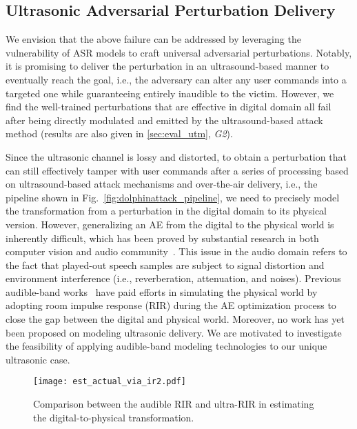

\subsection{Ultrasonic Adversarial Perturbation Delivery}\label{sec:preliminary_uap_delivery}
We envision that the above failure can be addressed by leveraging the vulnerability of ASR models to craft universal adversarial perturbations. Notably, it is promising to deliver the perturbation in an ultrasound-based manner to eventually reach the goal, i.e., the adversary can alter any user commands into a targeted one while guaranteeing entirely inaudible to the victim. However, we find the well-trained perturbations that are effective in digital domain all fail after being directly modulated and emitted by the ultrasound-based attack method (results are also given in \textsection\ref{sec:eval_utm}, \textit{G2}). 

Since the ultrasonic channel is lossy and distorted, to obtain a perturbation that can still effectively tamper with user commands after a series of processing based on ultrasound-based attack mechanisms and over-the-air delivery, i.e., the pipeline shown in Fig.~\ref{fig:dolphinattack_pipeline}, we need to precisely model the transformation from a perturbation in the digital domain to its physical version.
However, generalizing an AE from the digital to the physical world is inherently difficult, which has been proved by substantial research in both computer vision and audio community~\cite{jan2019connecting,carlini2018audio,chen2020metamorph,schonherr2020imperio,li2020advpulse,deng2022fencesitter,guo2022specpatch}. 
This issue in the audio domain refers to the fact that played-out speech samples are subject to signal distortion and environment interference (i.e., reverberation, attenuation, and noises). 
Previous audible-band works~\cite{rirIJCAI,schonherr2020imperio} have paid efforts in simulating the physical world by adopting room impulse response (RIR) during the AE optimization process to close the gap between the digital and physical world. Moreover, no work has yet been proposed on modeling ultrasonic delivery.
We are motivated to investigate the feasibility of applying audible-band modeling technologies to our unique ultrasonic case.
\begin{figure}[t]
    \centering
    \texttt{[image: est\_actual\_via\_ir2.pdf]}
    \caption{\label{fig:est_rir}Comparison between the audible RIR and ultra-RIR in estimating the digital-to-physical transformation.}
    \vspace{-10pt}
\end{figure}
